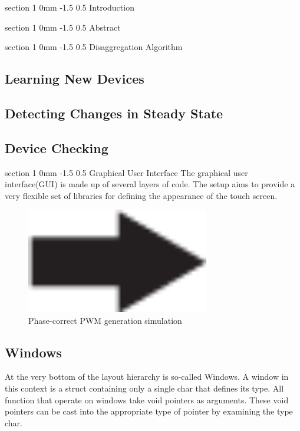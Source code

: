 \documentclass[danish,a4paper,11pt]{article}
\makeatletter
\numberwithin{equation}{section}
\renewcommand{\section}{\@startsection
	{section}%
	{1}%
	{0mm}%
	{-1.5\baselineskip}%
	{0.5\baselineskip}%
	{\normalfont\Large\bfseries}} %
\makeatother
\begin{document}
%

\tableofcontents
\newpage
	

\section{Introduction}


\section{Abstract}

\section{Disaggregation Algorithm}
\subsection{Learning New Devices}
\subsection{Detecting Changes in Steady State}
\subsection{Device Checking}

\section{Graphical User Interface}
The graphical user interface(GUI) is made up of several layers of code. The setup aims to provide a very flexible set of libraries for defining the appearance of the touch screen.

\begin{figure}[H]
	\centering
	\includegraphics[width=8cm]{Figurer/derp.png}
	\caption{Phase-correct PWM generation simulation}
	\label{fig:PWM}
\end{figure}

\subsection{Windows}
At the very bottom of the layout hierarchy is so-called Windows. A window in this context is a struct containing only a single char that defines its type. All function that operate on windows take void pointers as arguments. These void pointers can be cast into the appropriate type of pointer by examining the type char.\\
\end{document}
